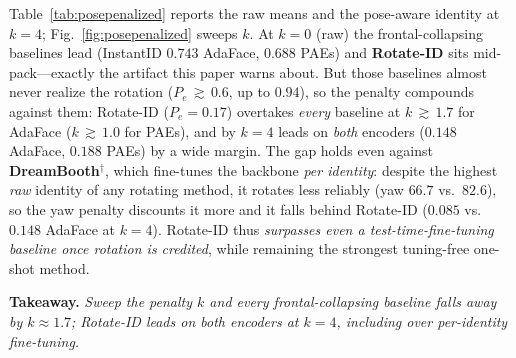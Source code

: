 Table~\ref{tab:posepenalized} reports the raw means and the pose-aware identity at
$k{=}4$; Fig.~\ref{fig:posepenalized} sweeps $k$. At $k{=}0$ (raw) the
frontal-collapsing baselines lead (InstantID $0.743$ AdaFace, $0.688$ PAEs) and
\textbf{Rotate-ID} sits mid-pack---exactly the artifact this paper warns about. But
those baselines almost never realize the rotation ($P_e\,{\gtrsim}\,0.6$, up to
$0.94$), so the penalty compounds against them: Rotate-ID ($P_e{=}0.17$) overtakes
\emph{every} baseline at $k\,{\gtrsim}\,1.7$ for AdaFace ($k\,{\gtrsim}\,1.0$ for
PAEs), and by $k{=}4$ leads on \emph{both} encoders ($0.148$ AdaFace, $0.188$ PAEs)
by a wide margin. The gap holds even against \textbf{DreamBooth}$^\dagger$, which
fine-tunes the backbone \emph{per identity}: despite the highest \emph{raw} identity
of any rotating method, it rotates less reliably (yaw $66.7$ vs.\ $82.6$), so the
yaw penalty discounts it more and it falls behind Rotate-ID ($0.085$ vs.\ $0.148$
AdaFace at $k{=}4$). Rotate-ID thus \emph{surpasses even a test-time-fine-tuning
baseline once rotation is credited}, while remaining the strongest tuning-free
one-shot method.

\noindent\textbf{Takeaway.} \emph{Sweep the penalty $k$ and every
frontal-collapsing baseline falls away by $k\!\approx\!1.7$; Rotate-ID leads on
both encoders at $k{=}4$, including over per-identity fine-tuning.}

